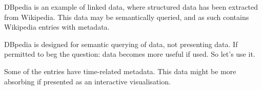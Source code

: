 DBpedia is an example of linked data, where structured data has been extracted 
from Wikipedia. This data may be semantically queried, and as such contains 
Wikipedia entries with metadata.

DBpedia is designed for semantic querying of data, not presenting data. If 
permitted to beg the question: data becomes more useful if used. So let's use 
it.

Some of the entries have time-related metadata. This data might be more 
absorbing if presented as an interactive visualisation.
